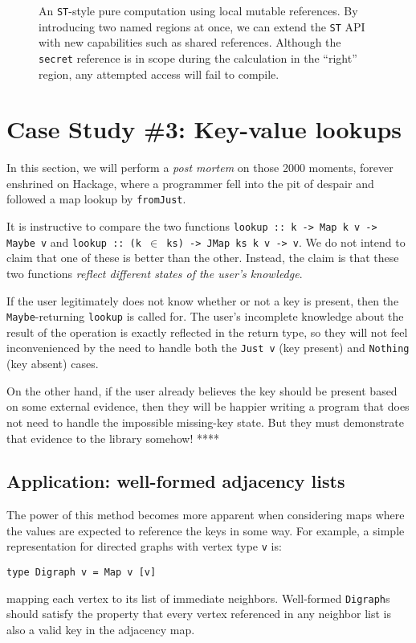 \documentclass[format=sigplan, review=false, screen=true]{acmart}
\begin{document}
\begin{figure}
  \inputminted{haskell}{st.hs}
  \caption{An \texttt{ST}-style pure computation using local mutable
    references. By introducing two named regions at once, we can extend
    the \texttt{ST} API with new capabilities such as shared references.
    Although the \texttt{secret} reference is in scope during the calculation
    in the ``right'' region, any attempted access will fail to compile.\label{st-example}}
\end{figure}

\section{Case Study \#3: Key-value lookups}

In this section, we will perform a \textit{post mortem} on those
2000 moments, forever enshrined on Hackage, where a programmer fell into
the pit of despair and followed a map lookup by \texttt{fromJust}.

It is instructive to compare the two functions \texttt{lookup :: k -> Map k v -> Maybe v}
and \texttt{lookup :: (k $\in$ ks) -> JMap ks k v -> v}. We do not intend to claim that
one of these is better than the other. Instead, the claim is that these two functions
\emph{reflect different states of the user's knowledge}.

If the user legitimately does not know whether or not a key is present, then the
\texttt{Maybe}-returning \texttt{lookup} is called for. The user's incomplete knowledge
about the result of the operation is exactly reflected in the return type, so they will
not feel inconvenienced by the need to handle both the \texttt{Just v} (key present)
and \texttt{Nothing} (key absent) cases.

On the other hand, if the user already believes the key should be present based on some
external evidence, then they will be happier writing a program that does not need to handle
the impossible missing-key state. But they must demonstrate that evidence to the library
somehow!  ****

\subsection{Application: well-formed adjacency lists}

The power of this method becomes more apparent when considering maps where
the values are expected to reference the keys in some way. For example, a
simple representation for directed graphs with vertex type \texttt{v} is:
\begin{verbatim}
type Digraph v = Map v [v]
\end{verbatim}
mapping each vertex to its list of immediate neighbors. Well-formed \texttt{Digraph}s
should satisfy the property that every vertex referenced in any neighbor list is also
a valid key in the adjacency map.
\end{document}
